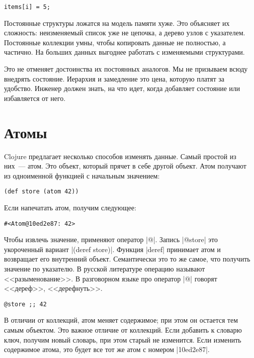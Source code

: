 \begin{verbatim}
items[i] = 5;
\end{verbatim}

Постоянные структуры ложатся на модель памяти хуже. Это объясняет их сложность:
неизменяемый список уже не цепочка, а дерево узлов с указателем. Постоянные
коллекции умны, чтобы копировать данные не полностью, а частично. На больших
данных выгоднее работать с изменяемыми структурами.

Это не отменяет достоинства их постоянных аналогов. Мы не призываем всюду
внедрять состояние. Иерархия и замедление это цена, которую платят за
удобство. Инженер должен знать, на что идет, когда добавляет состояние или
избавляется от него.

\section{Атомы}

Clojure предлагает несколько способов изменять данные. Самый простой из них~---
атом. Это объект, который прячет в себе другой объект. Атом получают из
одноименной функцией с начальным значением:

\begin{verbatim}
(def store (atom 42))
\end{verbatim}

Если напечатать атом, получим следующее:

\begin{verbatim}
#<Atom@10ed2e87: 42>
\end{verbatim}

Чтобы извлечь значение, применяют оператор \spverb|@|. Запись \spverb|@store|
это укороченный вариант \spverb|(deref store)|. Функция \spverb|deref| принимает
атом и возвращает его внутренний объект. Семантически это то же самое, что
получить значение по указателю. В русской литературе операцию называют
<<разыменование>>. В разговорном языке про оператор \spverb|@| говорят
<<дереф>>, <<дерефнуть>>.

\begin{verbatim}
@store ;; 42
\end{verbatim}

В отличии от коллекций, атом меняет содержимое; при этом он остается тем самым
объектом. Это важное отличие от коллекций. Если добавить к словарю ключ, получим
новый словарь, при этом старый не изменится. Если изменить содержимое атома, это
будет все тот же атом с номером \spverb|10ed2e87|.

